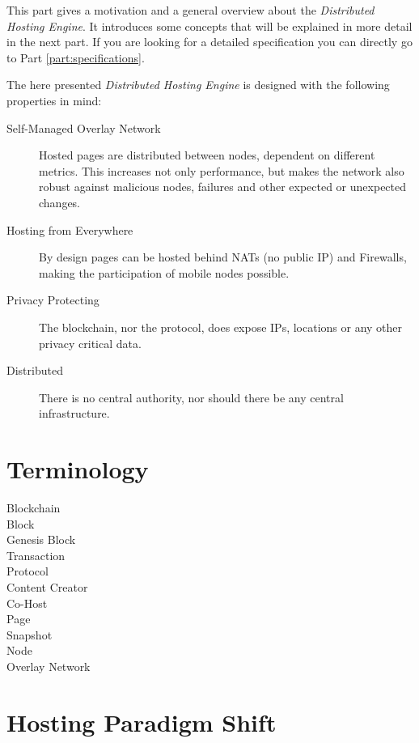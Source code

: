 
This part gives a motivation and a general overview about the
\textit{Distributed Hosting Engine}. It introduces some concepts that will be
explained in more detail in the next part. If you are looking for a detailed
specification you can directly go to Part \ref{part:specifications}.

The here presented \textit{Distributed Hosting Engine} is designed with the
following properties in mind:

\begin{description}
\item[Self-Managed Overlay Network] Hosted pages are distributed between
nodes, dependent on different metrics. This increases not only performance,
but makes the network also robust against malicious nodes, failures and other
expected or unexpected changes.
\item[Hosting from Everywhere] By design pages can be hosted behind NATs (no
public IP) and Firewalls, making the participation of mobile nodes possible.
\item[Privacy Protecting] The blockchain, nor the protocol, does expose
IPs, locations or any other privacy critical data.
\item[Distributed] There is no central authority, nor should there be any
central infrastructure.
\end{description}

\section{Terminology}

\begin{description}
\item[Blockchain]
\item[Block]
\item[Genesis Block]
\item[Transaction]
\item[Protocol]
\item[Content Creator]
\item[Co-Host]
\item[Page]
\item[Snapshot]
\item[Node]
\item[Overlay Network]
\end{description}

\section{Hosting Paradigm Shift}

